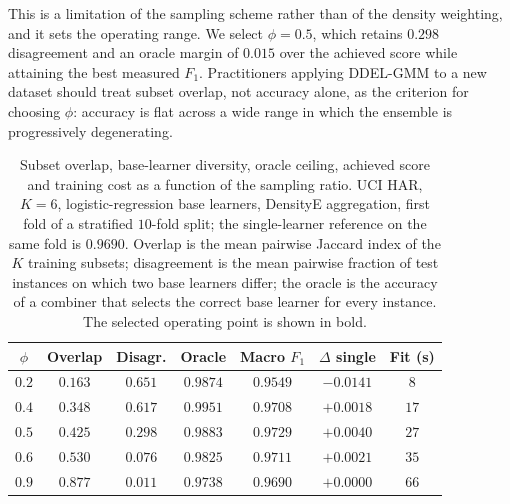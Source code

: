 \documentclass[lettersize,journal]{IEEEtran}
\begin{document}
	This is a limitation of the sampling scheme rather than of the density weighting, and it
	sets the operating range. We select $\phi = 0.5$, which retains $0.298$ disagreement and
	an oracle margin of $0.015$ over the achieved score while attaining the best measured
	$F_1$. Practitioners applying DDEL-GMM to a new dataset should treat subset overlap, not
	accuracy alone, as the criterion for choosing $\phi$: accuracy is flat across a wide
	range in which the ensemble is progressively degenerating.

	\begin{table}[!t]
		\centering
		\caption{Subset overlap, base-learner diversity, oracle ceiling, achieved score and
		training cost as a function of the sampling ratio. UCI HAR, $K = 6$,
		logistic-regression base learners, DensityE aggregation, first fold of a stratified
		$10$-fold split; the single-learner reference on the same fold is $0.9690$. Overlap is
		the mean pairwise Jaccard index of the $K$ training subsets; disagreement is the mean
		pairwise fraction of test instances on which two base learners differ; the oracle is
		the accuracy of a combiner that selects the correct base learner for every instance.
		The selected operating point is shown in bold.}
		\label{tab:diversity_cost}
		\begin{tabular}{ccccccc}
			\hline
			$\phi$ & Overlap & Disagr. & Oracle & Macro $F_1$ & $\Delta$ single & Fit (s) \\
			\hline
			$0.2$ & $0.163$ & $0.651$ & $0.9874$ & $0.9549$ & $-0.0141$ & $8$ \\
			$0.4$ & $0.348$ & $0.617$ & $0.9951$ & $0.9708$ & $+0.0018$ & $17$ \\
			$0.5$ & $0.425$ & $0.298$ & $0.9883$ & $\mathbf{0.9729}$ & $+0.0040$ & $27$ \\
			$0.6$ & $0.530$ & $0.076$ & $0.9825$ & $0.9711$ & $+0.0021$ & $35$ \\
			$0.9$ & $0.877$ & $0.011$ & $0.9738$ & $0.9690$ & $+0.0000$ & $66$ \\
			\hline
		\end{tabular}
	\end{table}
\end{document}
